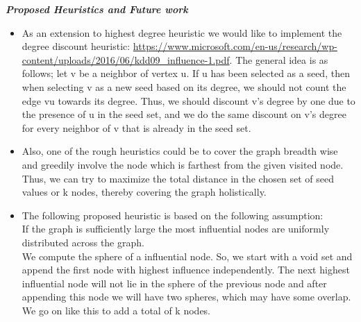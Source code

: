 \documentclass[letterpaper,onecolumn,10pt]{article}
\begin{document}
\textbf{\textit{Proposed Heuristics and Future work}}
\begin{itemize}
\item As an extension to highest degree heuristic we would like to implement the degree discount heuristic: \url{https://www.microsoft.com/en-us/research/wp-content/uploads/2016/06/kdd09_influence-1.pdf}. 
The general idea is as follows; let v be a neighbor of vertex u.
If u has been selected as a seed, then when selecting v as a new seed based on its degree, we should not count the edge vu towards its degree. Thus, we should discount v's degree by one due
to the presence of u in the seed set, and we do the same discount on v’s degree for every neighbor of v that is already in the seed set.

\item  Also, one of the rough heuristics could be to cover the graph breadth wise and greedily involve the node which is farthest from the given visited node. Thus, we can try to maximize the total distance in the chosen set of seed values or k nodes, thereby covering the graph holistically. 

\item The following proposed heuristic is based on the following assumption:\\
\indent If the graph is sufficiently large the most influential nodes are uniformly distributed across the graph. \\
\indent We compute the sphere of a influential node. So, we start with a void set and append the first node with highest influence independently. The next highest influential node will not lie in the sphere of the previous node and after appending this node we will have two spheres, which may have some overlap. We go on like this to add a total of k nodes.
\end{itemize}
\end{document}

